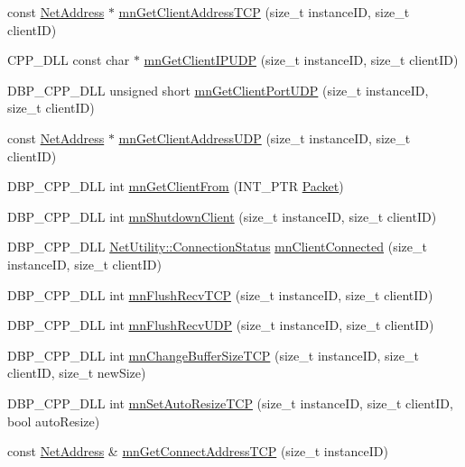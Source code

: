 \begin{DoxyCompactItemize}
\item 
const \hyperlink{class_net_address}{NetAddress} $\ast$ \hyperlink{group__proc_commands_gaf609f471da0b48a6a955630a1e2dd6be}{mnGetClientAddressTCP} (size\_\-t instanceID, size\_\-t clientID)
\item 
CPP\_\-DLL const char $\ast$ \hyperlink{group__proc_commands_ga0d9b38d97906d466ce0070ef549860fe}{mnGetClientIPUDP} (size\_\-t instanceID, size\_\-t clientID)
\item 
DBP\_\-CPP\_\-DLL unsigned short \hyperlink{group__proc_commands_ga8604a4693616d0715e06c08416804297}{mnGetClientPortUDP} (size\_\-t instanceID, size\_\-t clientID)
\item 
const \hyperlink{class_net_address}{NetAddress} $\ast$ \hyperlink{group__proc_commands_gaebfce0412edce2520f8fd499308b2955}{mnGetClientAddressUDP} (size\_\-t instanceID, size\_\-t clientID)
\item 
DBP\_\-CPP\_\-DLL int \hyperlink{group__proc_commands_ga893e7a42e875cfc75c6ebf7a7672d9cb}{mnGetClientFrom} (INT\_\-PTR \hyperlink{class_packet}{Packet})
\item 
DBP\_\-CPP\_\-DLL int \hyperlink{group__proc_commands_ga6de40734944378fc47b970e82739e60b}{mnShutdownClient} (size\_\-t instanceID, size\_\-t clientID)
\item 
DBP\_\-CPP\_\-DLL \hyperlink{class_net_utility_a7eae52138f8bd597ffc67ebf07e86b6d}{NetUtility::ConnectionStatus} \hyperlink{group__proc_commands_ga06bd89fdaf152806f4c2f3a9b4abfae0}{mnClientConnected} (size\_\-t instanceID, size\_\-t clientID)
\item 
DBP\_\-CPP\_\-DLL int \hyperlink{group__proc_commands_ga7c734249b65877579ed80cb604f3c638}{mnFlushRecvTCP} (size\_\-t instanceID, size\_\-t clientID)
\item 
DBP\_\-CPP\_\-DLL int \hyperlink{group__proc_commands_ga7906f6bad100b8ac04f6fda92f78db37}{mnFlushRecvUDP} (size\_\-t instanceID, size\_\-t clientID)
\item 
DBP\_\-CPP\_\-DLL int \hyperlink{group__proc_commands_ga45512c25fa483ff9d9d12f486dd225dd}{mnChangeBufferSizeTCP} (size\_\-t instanceID, size\_\-t clientID, size\_\-t newSize)
\item 
DBP\_\-CPP\_\-DLL int \hyperlink{group__proc_commands_ga5b3a8551fa3dd795dc0c03556ebd7843}{mnSetAutoResizeTCP} (size\_\-t instanceID, size\_\-t clientID, bool autoResize)
\item 
const \hyperlink{class_net_address}{NetAddress} \& \hyperlink{group__proc_commands_ga5c4ebf0ca006ab0bd1750a6adefe907d}{mnGetConnectAddressTCP} (size\_\-t instanceID)

\end{DoxyCompactItemize}
